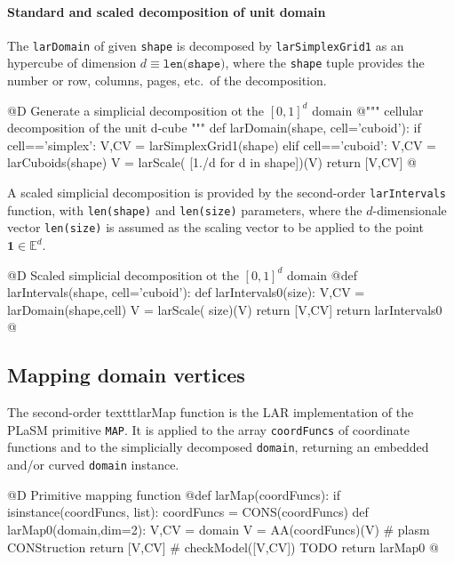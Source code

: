 \documentclass[11pt,oneside]{article}	%
\def\E{\mathbb{E}}
\begin{document}
\paragraph{Standard and scaled decomposition of unit domain}
The \texttt{larDomain} of given \texttt{shape} is decomposed by \texttt{larSimplexGrid1} as an hypercube of dimension $d \equiv\texttt{len(shape)}$, where the \texttt{shape} tuple provides the number or row, columns, pages, etc.~of the decomposition.

@D Generate a simplicial decomposition ot the $[0,1]^d$ domain
@{""" cellular decomposition of the unit d-cube """
def larDomain(shape, cell='cuboid'):
	if cell=='simplex': V,CV = larSimplexGrid1(shape)
	elif cell=='cuboid': V,CV = larCuboids(shape)
	V = larScale( [1./d for d in shape])(V)
	return [V,CV]
@}

A scaled simplicial decomposition is provided by the second-order  \texttt{larIntervals} function, with \texttt{len(shape)} and \texttt{len(size)} parameters, where the $d$-dimensionale vector \texttt{len(size)} is assumed as the scaling vector to be applied to the point $\mathbf{1}\in\E^d$.

@D Scaled simplicial decomposition ot the $[0,1]^d$ domain
@{def larIntervals(shape, cell='cuboid'):
	def larIntervals0(size):
		V,CV = larDomain(shape,cell)
		V = larScale( size)(V)
		return [V,CV]
	return larIntervals0
@}

\subsection{Mapping domain vertices}
The second-order texttt{larMap} function is the LAR implementation of the PLaSM primitive \texttt{MAP}.
It is applied to the array \texttt{coordFuncs} of coordinate functions and to the simplicially decomposed  \texttt{domain}, returning an embedded and/or curved \texttt{domain} instance.

@D Primitive mapping function 
@{def larMap(coordFuncs):
	if isinstance(coordFuncs, list): coordFuncs = CONS(coordFuncs)
	def larMap0(domain,dim=2):
		V,CV = domain
		V = AA(coordFuncs)(V)  # plasm CONStruction
		return [V,CV]
		# checkModel([V,CV])  TODO
	return larMap0
@}
\end{document}
